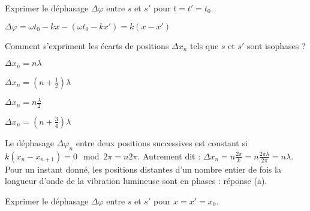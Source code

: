 
\begin{enonce}
	Exprimer le déphasage $\Delta \varphi$ entre $s$ et $s'$ pour $t=t'=t_0$.
	\end{enonce}
	
	
	\begin{corrige}
	$\Delta \varphi = \omega t_0 - k x - \left( \omega t_0 - k x' \right) = k \left(x-x'\right)$
	\end{corrige}
	


\begin{enonce}
	Comment s'expriment les écarts de positions $\Delta x_n$ tels que $s$ et $s'$ sont isophases ? 
	\begin{listeQCM2Colonnes}
	\item $\Delta x_n = n \lambda$
	\item $\Delta x_n = \left(n+\frac{1}{2}\right) \lambda$
	\item $\Delta x_n = n \frac{\lambda}{2}$
	\item $\Delta x_n = \left(n+\frac{3}{4}\right) \lambda$
	\end{listeQCM2Colonnes}

\end{enonce}

\reponse{\reponseA{}}

\begin{corrige}
	Le déphasage $\Delta \varphi_n$ entre deux positions successives est constant si $k \left(x_n-x_{n+1}\right)= 0 \mod 2\pi = n 2\pi$. Autrement dit : $\Delta x_n = n\frac{2\pi}{k}= n\frac{2\pi \lambda}{2\pi}= n \lambda$. Pour un instant donné, les positions distantes d'un nombre entier de fois la longueur d'onde de la vibration lumineuse sont en phases : réponse (a).
\end{corrige}


\begin{enonce}
	Exprimer le déphasage $\Delta \varphi$ entre $s$ et $s'$ pour $x=x'=x_0$.
	\end{enonce}
	
